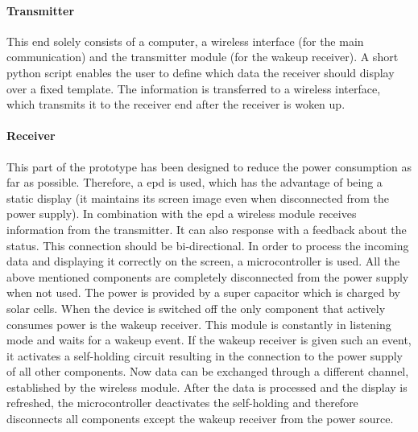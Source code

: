 \paragraph{Transmitter}
This end solely consists of a computer, a wireless interface (for the main communication) and the transmitter module (for the wakeup receiver). A short python script enables the user to define which data the receiver should display over a fixed template. The information is transferred to a wireless interface, which transmits it to the receiver end after the receiver is woken up.

\paragraph{Receiver}
This part of the prototype has been designed to reduce the power consumption as far as possible. Therefore, a \acs{epd} is used, which has the advantage of being a static display (it maintains its screen image even when disconnected from the power supply). In combination with the \acs{epd} a wireless module receives information from the transmitter. It can also response with a feedback about the status. This connection should be bi-directional. In order to process the incoming data and displaying it correctly on the screen, a microcontroller is used. All the above mentioned components  are completely disconnected from the power supply when not used. The power is provided by a super capacitor which is charged by solar cells. When the device  is switched off the only component that actively consumes power is the wakeup receiver. This module is constantly in listening mode and waits for a wakeup event. If the wakeup receiver is given such an event, it activates a self-holding circuit resulting in the connection to the power supply of all other components. Now data can be exchanged through a different channel, established by the wireless module. After the data is processed and the display is refreshed, the microcontroller deactivates the self-holding and therefore disconnects all components except the wakeup receiver from the power source.